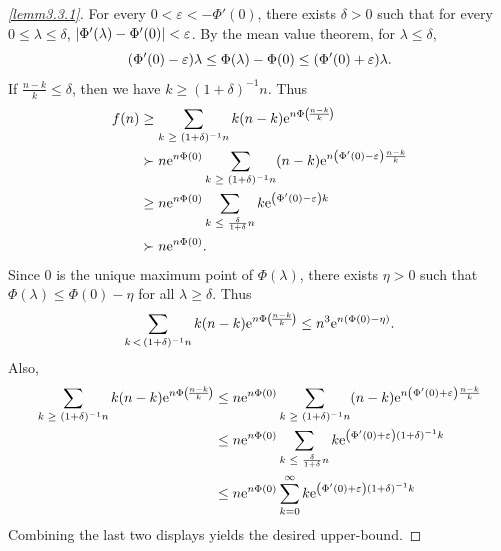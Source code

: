 \documentclass[AHL,Unicode,longabstracts]{cedram}
\newcommand{\rme}{\mathrm{e}}
\let\originalleft\left
\let\originalright\right
\renewcommand{\left}{\mathopen{}\mathclose\bgroup\originalleft}
\renewcommand{\right}{\aftergroup\egroup\originalright}
\let\oldge\ge
\renewcommand{\ge}{\mathchoice{\oldge}{\oldge}{\,\oldge\,}{\,\oldge\,}}
\let\oldle\le
\renewcommand{\le}{\mathchoice{\oldle}{\oldle}{\,\oldle\,}{\,\oldle\,}}
\begin{document}
\begin{proofc}
\begin{proof}[{\eqref{lemm3.3.1}}]
For every $0 < \varepsilon < - \Phi'(0)$, there exists $\delta > 0$ such that for every $0 \leq \lambda \leq \delta$, $\left| \Phi'(\lambda) - \Phi'(0) \right| < \varepsilon$. By the mean value theorem, for $\lambda \leq \delta$,
\[
\left(\Phi'(0) - \varepsilon \right) \lambda \leq \Phi(\lambda) - \Phi(0) \leq \left(\Phi'(0) + \varepsilon \right) \lambda.
\]
If $\frac{n - k}{k} \leq \delta$, then we have $k \geq (1+\delta)^{-1}n$. Thus
\begin{align*}
f(n) &\geq \sum_{k \ge (1+\delta)^{-1} n} k (n - k) \rme^{n \Phi \left(\!\frac{n - k}{k}\!\right)} \\
&\succ n \rme^{n \Phi(0)} \sum_{k \ge (1+\delta)^{-1} n} (n - k) \rme^{n \left(\Phi'(0) - \varepsilon \right) \frac{n - k}{k}} \\
&\geq n \rme^{n \Phi(0)} \sum_{k \le \frac{\delta}{1 + \delta} n} k \rme^{\left(\Phi'(0) - \varepsilon \right) k} \\
&\succ  n \rme^{n \Phi(0)}.
\end{align*}
Since $0$ is the unique maximum point of $\Phi(\lambda)$, there exists $\eta > 0$ such that $\Phi(\lambda) \leq \Phi(0) - \eta$ for all $\lambda \geq \delta$. Thus
\[
\sum_{k\,<\,(1 + \delta)^{-1}n } k (n - k) \rme^{n \Phi \left(\!\frac{n - k}{k}\!\right)}
\leq n^3 \rme^{n \left(\Phi(0) - \eta \right)}.
\]
Also,
\begin{align*}
\sum_{k \ge (1 + \delta)^{-1} n} k (n - k) \rme^{n \Phi \left(\!\frac{n - k}{k}\!\right)}
&\leq n \rme^{n \Phi(0)} \sum_{k \ge (1 + \delta)^{-1} n} (n - k) \rme^{n \left(\Phi'(0) + \varepsilon \right) \frac{n - k}{k}} \\
&\leq n \rme^{n \Phi(0)} \sum_{k \le \frac{\delta}{1 + \delta}n} k \rme^{\left(\Phi'(0) + \varepsilon \right) (1 + \delta)^{-1} k} \\
&\leq n \rme^{n \Phi(0)} \sum_{k = 0}^{\infty} k \rme^{\left(\Phi'(0) + \varepsilon \right) (1 + \delta)^{-1} k}
\end{align*}
Combining the last two displays yields the desired upper-bound.
\let\qed\relax
\end{proof}


\end{proofc}
\end{document}
